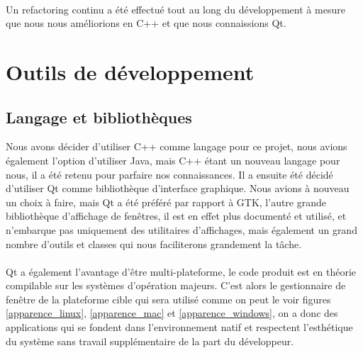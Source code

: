 \paragraph{}
Un refactoring continu a été effectué tout au long du développement à mesure que nous nous améliorions en C++ et que nous connaissions Qt.

\section{Outils de développement}

\subsection{Langage et bibliothèques}

Nous avons décider d'utiliser C++ comme langage pour ce projet, nous avions également l'option d'utiliser Java, mais C++ étant un nouveau langage pour nous, il a été retenu pour parfaire nos connaissances. Il a ensuite été décidé d'utiliser Qt comme bibliothèque d'interface graphique. Nous avions à nouveau un choix à faire, mais Qt a été préféré par rapport à GTK, l'autre grande bibliothèque d'affichage de fenêtres, il est en effet plus documenté et utilisé, et n'embarque pas uniquement des utilitaires d'affichages, mais également un grand nombre d'outils et classes qui nous faciliterons grandement la tâche.
\paragraph{}
Qt a également l'avantage d'être multi-plateforme, le code produit est en théorie compilable sur les systèmes d'opération majeurs. C'est alors le gestionnaire de fenêtre de la plateforme cible qui sera utilisé comme on peut le voir figures \ref{apparence_linux}, \ref{apparence_mac} et \ref{apparence_windows}, on a donc des applications qui se fondent dans l'environnement natif et respectent l'esthétique du système sans travail supplémentaire de la part du développeur.

